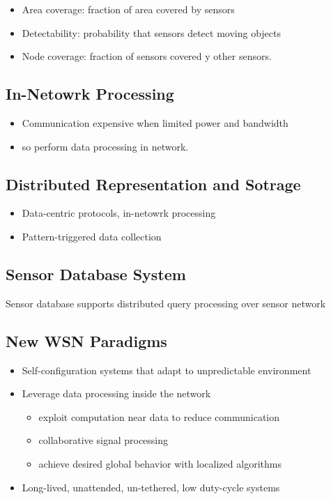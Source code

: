 \documentclass[letterpaper,10pt]{article}
\begin{document}
\begin{itemize}
	\item Area coverage: fraction of area covered by sensors
	\item Detectability: probability that sensors detect moving objects
	\item Node coverage: fraction of sensors covered y other sensors.
\end{itemize}

\subsection{In-Netowrk Processing}

\begin{itemize}
	\item Communication expensive when limited power and bandwidth
	\item so perform data processing in network.
\end{itemize}

\subsection{Distributed Representation and Sotrage}

\begin{itemize}
	\item Data-centric protocols, in-netowrk processing
	\item Pattern-triggered data collection
\end{itemize}

\subsection{Sensor Database System}

Sensor database supports distributed query processing over sensor network

\subsection{New WSN Paradigms}

\begin{itemize}
	\item Self-configuration systems that adapt to unpredictable environment
	\item Leverage data processing inside the network
	\begin{itemize}
		\item exploit computation near data to reduce communication
		\item collaborative signal processing
		\item achieve desired global behavior with localized algorithms
	\end{itemize}
	\item Long-lived, unattended, un-tethered, low duty-cycle systems
\end{itemize}
\end{document}
